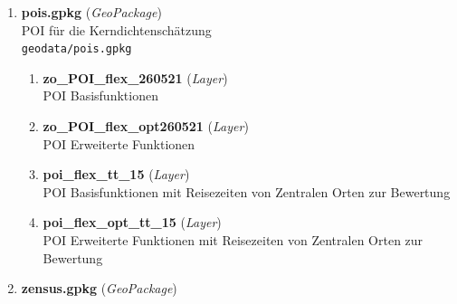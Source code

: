 \begin{enumerate}[label=\arabic*, leftmargin=*, itemsep=0.5em, topsep=0.3em]
\begin{enumerate}[label=\arabic{enumi}.\arabic*, leftmargin=*, itemsep=0.5em, topsep=0.3em]
\texttt{\small geodata/zentrale\_orte.gpkg}
\begin{enumerate}[label=\arabic{enumi}.\arabic{enumii}.\arabic*, leftmargin=*, itemsep=0.5em, topsep=0.3em]
\item \textbf{zhv\_20260521} \textnormal{(\textit{Layer})}\\
Zuschnitt des Zentralen Haltestellenverzeichnis
\item \textbf{zentrale\_orte\_rlp} \textnormal{(\textit{Layer})}\\
Zentrale Orte in Rheinland-Pfalz, auf Grundlage der Regionalpläne
\item \textbf{zentrale\_orte} \textnormal{(\textit{Layer})}\\
Initiale Ergebnisse der Kerndichtenschätzung
\item \textbf{zentrale\_orte\_oz\_manual} \textnormal{(\textit{Layer})}\\
Überarbeitete Zentrale Orte auf Grundlage der Zentrenkonzepte der OZ
\item \textbf{zentraleOrte\_routingdestinations\_zentrenkonzept} \textnormal{(\textit{Layer})}\\
Zusammengefasste Zentrale Orte (Zielorte Anbindungsindikator)
\end{enumerate}
\item \textbf{pois.gpkg} \textnormal{(\textit{GeoPackage})}\\
POI für die Kerndichtenschätzung\\
\texttt{\small geodata/pois.gpkg}
\begin{enumerate}[label=\arabic{enumi}.\arabic{enumii}.\arabic*, leftmargin=*, itemsep=0.5em, topsep=0.3em]
\item \textbf{zo\_POI\_flex\_260521} \textnormal{(\textit{Layer})}\\
POI Basisfunktionen
\item \textbf{zo\_POI\_flex\_opt260521} \textnormal{(\textit{Layer})}\\
POI Erweiterte Funktionen
\item \textbf{poi\_flex\_tt\_15} \textnormal{(\textit{Layer})}\\
POI Basisfunktionen mit Reisezeiten von Zentralen Orten zur Bewertung
\item \textbf{poi\_flex\_opt\_tt\_15} \textnormal{(\textit{Layer})}\\
POI Erweiterte Funktionen mit Reisezeiten von Zentralen Orten zur Bewertung
\end{enumerate}
\item \textbf{zensus.gpkg} \textnormal{(\textit{GeoPackage})}\\

\end{enumerate}
\end{enumerate}
